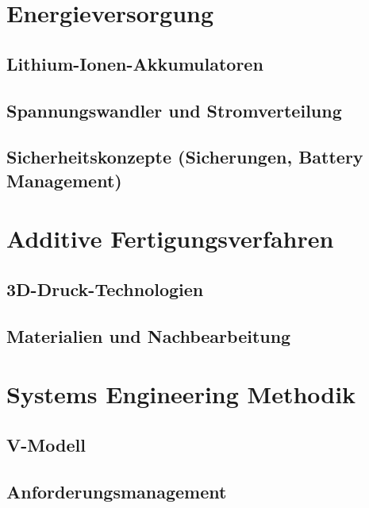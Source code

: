 \section{Energieversorgung}
\subsection{Lithium-Ionen-Akkumulatoren}
\subsection{Spannungswandler und Stromverteilung}
\subsection{Sicherheitskonzepte (Sicherungen, Battery Management)}

\section{Additive Fertigungsverfahren}
\subsection{3D-Druck-Technologien}
\subsection{Materialien und Nachbearbeitung}

\section{Systems Engineering Methodik}
\subsection{V-Modell}
\subsection{Anforderungsmanagement}




%
%

